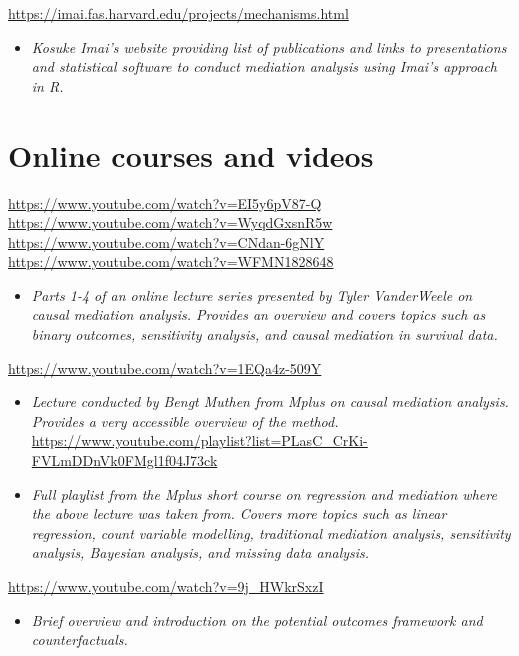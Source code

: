 \documentclass[
]{book}
\providecommand{\tightlist}{%
  \setlength{\itemsep}{0pt}\setlength{\parskip}{0pt}}
\begin{document}
\url{https://imai.fas.harvard.edu/projects/mechanisms.html}

\begin{itemize}
\tightlist
\item
  \emph{Kosuke Imai's website providing list of publications and links to presentations and statistical software to conduct mediation analysis using Imai's approach in R.}
\end{itemize}

\section{Online courses and videos}\label{online-courses-and-videos-2}

\url{https://www.youtube.com/watch?v=EI5y6pV87-Q}
\url{https://www.youtube.com/watch?v=WyqdGxsnR5w}
\url{https://www.youtube.com/watch?v=CNdan-6gNlY}
\url{https://www.youtube.com/watch?v=WFMN1828648}

\begin{itemize}
\tightlist
\item
  \emph{Parts 1-4 of an online lecture series presented by Tyler VanderWeele on causal mediation analysis. Provides an overview and covers topics such as binary outcomes, sensitivity analysis, and causal mediation in survival data.}
\end{itemize}

\url{https://www.youtube.com/watch?v=1EQa4z-509Y}

\begin{itemize}
\item
  \emph{Lecture conducted by Bengt Muthen from Mplus on causal mediation analysis. Provides a very accessible overview of the method.}
  \url{https://www.youtube.com/playlist?list=PLasC_CrKi-FVLmDDnVk0FMgl1f04J73ck}
\item
  \emph{Full playlist from the Mplus short course on regression and mediation where the above lecture was taken from. Covers more topics such as linear regression, count variable modelling, traditional mediation analysis, sensitivity analysis, Bayesian analysis, and missing data analysis.}
\end{itemize}

\url{https://www.youtube.com/watch?v=9j_HWkrSxzI}

\begin{itemize}
\tightlist
\item
  \emph{Brief overview and introduction on the potential outcomes framework and counterfactuals.}
\end{itemize}
\end{document}
